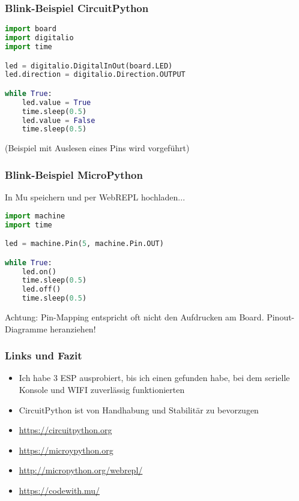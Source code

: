 \documentclass{beamer}
\begin{document}
\begin{frame}[fragile]

\frametitle{Blink-Beispiel CircuitPython}

\begin{lstlisting}[language=Python] 
import board
import digitalio
import time

led = digitalio.DigitalInOut(board.LED)
led.direction = digitalio.Direction.OUTPUT

while True:
    led.value = True
    time.sleep(0.5)
    led.value = False
    time.sleep(0.5)

\end{lstlisting} 

(Beispiel mit Auslesen eines Pins wird vorgeführt)

\end{frame}

\begin{frame}[fragile]

\frametitle{Blink-Beispiel MicroPython}

In Mu speichern und per WebREPL hochladen...

\begin{lstlisting}[language=Python] 
import machine
import time

led = machine.Pin(5, machine.Pin.OUT)

while True:
    led.on()
    time.sleep(0.5)
    led.off()
    time.sleep(0.5)

\end{lstlisting} 

Achtung: Pin-Mapping entspricht oft nicht den Aufdrucken am Board. Pinout-Diagramme heranziehen!

\end{frame}

\begin{frame}[fragile]
\frametitle{Links und Fazit}

\begin{itemize}
\item Ich habe 3 ESP ausprobiert, bis ich einen gefunden habe, bei dem serielle Konsole und WIFI zuverlässig funktionierten
\item CircuitPython ist von Handhabung und Stabilitär zu bevorzugen
\item \href{CircuitPython}{https://circuitpython.org}
\item \href{MicroPython}{https://microypython.org}
\item \href{WebREPL}{http://micropython.org/webrepl/}
\item \href{EditorMu}{https://codewith.mu/}
\end{itemize}

\end{frame}
\end{document}
